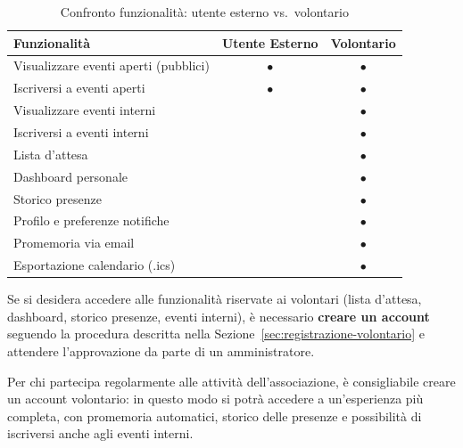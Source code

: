 \documentclass[a4paper,11pt,oneside]{book}
\begin{document}
\begin{table}[htbp]
\centering
\caption{Confronto funzionalit\`a: utente esterno vs.\ volontario}
\label{tab:confronto-esterno-volontario}
\begin{tabularx}{\textwidth}{X c c}
\toprule
\textbf{Funzionalit\`a} & \textbf{Utente Esterno} & \textbf{Volontario} \\
\midrule
Visualizzare eventi aperti (pubblici)           & $\bullet$ & $\bullet$ \\
Iscriversi a eventi aperti                      & $\bullet$ & $\bullet$ \\
Visualizzare eventi interni                     &           & $\bullet$ \\
Iscriversi a eventi interni                     &           & $\bullet$ \\
Lista d'attesa                                  &           & $\bullet$ \\
Dashboard personale                             &           & $\bullet$ \\
Storico presenze                                &           & $\bullet$ \\
Profilo e preferenze notifiche                  &           & $\bullet$ \\
Promemoria via email                            &           & $\bullet$ \\
Esportazione calendario (.ics)                  &           & $\bullet$ \\
\bottomrule
\end{tabularx}
\end{table}

\begin{infobox}
Se si desidera accedere alle funzionalit\`a riservate ai volontari (lista d'attesa, dashboard, storico presenze, eventi interni), \`e necessario \textbf{creare un account} seguendo la procedura descritta nella Sezione~\ref{sec:registrazione-volontario} e attendere l'approvazione da parte di un amministratore.
\end{infobox}

\begin{tipbox}
Per chi partecipa regolarmente alle attivit\`a dell'associazione, \`e consigliabile creare un account volontario: in questo modo si potr\`a accedere a un'esperienza pi\`u completa, con promemoria automatici, storico delle presenze e possibilit\`a di iscriversi anche agli eventi interni.
\end{tipbox}
\end{document}
